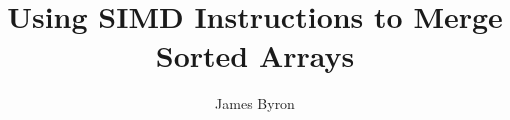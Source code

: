 \documentclass[sigconf,10pt]{acmart}
\begin{document}
\title{Using SIMD Instructions to Merge Sorted Arrays}

\author{James Byron}


\begin{abstract} 

\end{abstract}

\maketitle

\sloppy




\end{document}
